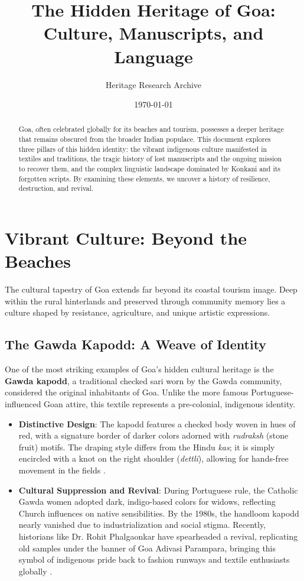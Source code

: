 \documentclass[12pt,a4paper]{article}
\title{The Hidden Heritage of Goa:\\Culture, Manuscripts, and Language}
\author{Heritage Research Archive}
\date{\today}
\begin{document}
\maketitle

\begin{abstract}
Goa, often celebrated globally for its beaches and tourism, possesses a deeper heritage that remains obscured from the broader Indian populace. This document explores three pillars of this hidden identity: the vibrant indigenous culture manifested in textiles and traditions, the tragic history of lost manuscripts and the ongoing mission to recover them, and the complex linguistic landscape dominated by Konkani and its forgotten scripts. By examining these elements, we uncover a history of resilience, destruction, and revival.
\end{abstract}

\tableofcontents
\newpage

\section{Vibrant Culture: Beyond the Beaches}
The cultural tapestry of Goa extends far beyond its coastal tourism image. Deep within the rural hinterlands and preserved through community memory lies a culture shaped by resistance, agriculture, and unique artistic expressions.

\subsection{The Gawda Kapodd: A Weave of Identity}
One of the most striking examples of Goa's hidden cultural heritage is the \textbf{Gawda kapodd}, a traditional checked sari worn by the Gawda community, considered the original inhabitants of Goa. Unlike the more famous Portuguese-influenced Goan attire, this textile represents a pre-colonial, indigenous identity.

\begin{itemize}
    \item \textbf{Distinctive Design}: The kapodd features a checked body woven in hues of red, with a signature border of darker colors adorned with \textit{rudraksh} (stone fruit) motifs. The draping style differs from the Hindu \textit{kas}; it is simply encircled with a knot on the right shoulder (\textit{dettli}), allowing for hands-free movement in the fields \cite{Sardessai2022}.
    \item \textbf{Cultural Suppression and Revival}: During Portuguese rule, the Catholic Gawda women adopted dark, indigo-based colors for widows, reflecting Church influences on native sensibilities. By the 1980s, the handloom kapodd nearly vanished due to industrialization and social stigma. Recently, historians like Dr. Rohit Phalgaonkar have spearheaded a revival, replicating old samples under the banner of Goa Adivasi Parampara, bringing this symbol of indigenous pride back to fashion runways and textile enthusiasts globally \cite{Sardessai2022}.
\end{itemize}
\end{document}
